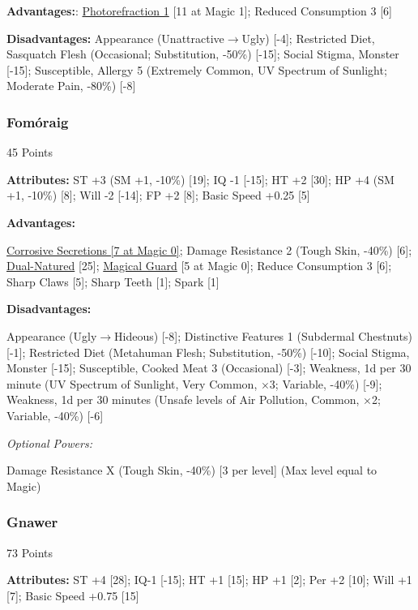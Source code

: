 \begin{multicols*}{3}
	\textbf{Advantages:}:
	\hyperref[photorefraction]{Photorefraction 1} [11 at Magic 1]; Reduced Consumption 3 [6]
	
	\textbf{Disadvantages:}	
	Appearance (Unattractive$\rightarrow$Ugly) [-4]; Restricted Diet, Sasquatch Flesh (Occasional; Substitution, -50\%) [-15]; Social Stigma, Monster [-15]; Susceptible, Allergy 5 (Extremely Common, UV Spectrum of Sunlight; Moderate Pain, -80\%) [-8] 
	
	\subsubsection{Fomóraig}\label{formoraig}
	\begin{flushright}
		45 Points
	\end{flushright}
	
	\textbf{Attributes:}
	ST +3 (SM +1, -10\%) [19]; IQ -1 [-15]; HT +2 [30]; HP +4 (SM +1, -10\%) [8]; Will -2 [-14]; FP +2 [8]; Basic Speed +0.25 [5]
	
	\textbf{Advantages:}

	\hyperref[corrosive_secretions]{Corrosive Secretions [7 at Magic 0]}; Damage Resistance 2 (Tough Skin, -40\%) [6]; \hyperref[dual_natured]{Dual-Natured} [25]; \hyperref[magical_guard]{Magical Guard} [5 at Magic 0]; Reduce Consumption 3 [6]; Sharp Claws [5]; Sharp Teeth [1]; Spark [1]
	
	\textbf{Disadvantages:}
	
	Appearance (Ugly$\rightarrow$Hideous) [-8]; Distinctive Features 1 (Subdermal Chestnuts) [-1]; Restricted Diet (Metahuman Flesh; Substitution, -50\%) [-10]; Social Stigma, Monster [-15]; Susceptible, Cooked Meat 3 (Occasional) [-3]; Weakness, 1d per 30 minute (UV Spectrum of Sunlight, Very Common, $\times$3; Variable, -40\%) [-9]; Weakness, 1d per 30 minutes (Unsafe levels of Air Pollution, Common, $\times$2; Variable, -40\%) [-6]
	
	\textit{Optional Powers:}
	
	Damage Resistance X (Tough Skin, -40\%) [3 per level] (Max level equal to Magic)
	
	\subsubsection{Gnawer}\label{gnawer}
	\begin{flushright}
		73 Points
	\end{flushright}

	\textbf{Attributes:}	
	ST +4 [28]; IQ-1 [-15]; HT +1 [15]; HP +1 [2]; Per +2 [10]; Will +1 [7]; Basic Speed +0.75 [15]
	

\end{multicols*}

